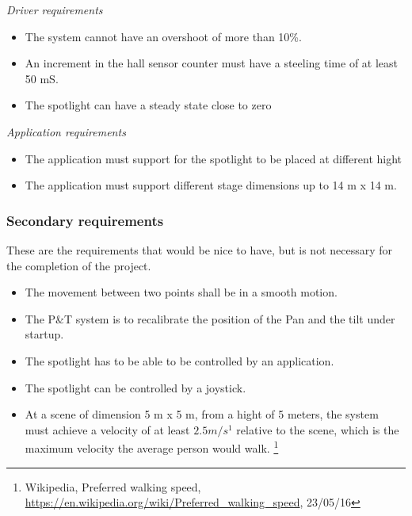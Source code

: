 \textit{Driver requirements}
\begin{itemize}
\item The system cannot have an overshoot of more than 10\%.

\item An increment in the hall sensor counter must have a steeling time of at least 50 mS. 


\item The spotlight can have a steady state close to zero
\end{itemize}


\textit{Application requirements}
\begin{itemize}

\item The application must support for the spotlight to be placed at different hight

\item The application must support different stage dimensions up to 14 m x 14 m. 

\end{itemize}


\subsubsection{Secondary requirements}
These are the requirements that would be nice to have, but is not necessary for the completion of the project. 

\begin{itemize}
\item The movement between two points shall be in a smooth motion.

\item The P\&T system is to recalibrate the position of the Pan and the tilt under startup.

\item The spotlight has to be able to be controlled by an application.

\item The spotlight can be controlled by a joystick.

\item At a scene of dimension 5 m x 5 m, from a hight of 5 meters, the system must achieve a velocity of at least $2.5 m/s^{1}$ relative to the scene, which is the maximum velocity the average person would walk. 
\footnote{Wikipedia, Preferred walking speed, \url{https://en.wikipedia.org/wiki/Preferred_walking_speed}, 23/05/16}

\end{itemize}
